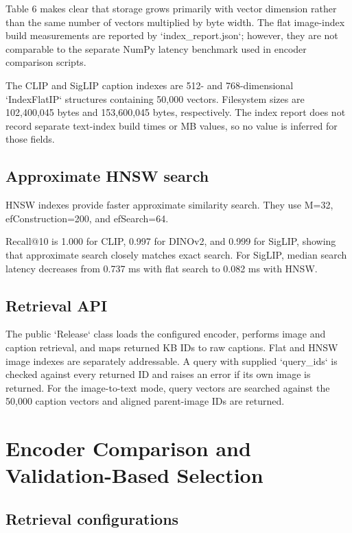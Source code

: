 \documentclass{article}
\begin{document}
Table 6 makes clear that storage grows primarily with vector dimension
rather than the same number of vectors multiplied by byte width. The
flat image-index build measurements are reported by
`index\_report.json`; however, they are not comparable to the separate
NumPy latency benchmark used in encoder comparison scripts.

The CLIP and SigLIP caption indexes are 512- and 768-dimensional
`IndexFlatIP` structures containing 50,000 vectors. Filesystem sizes are
102,400,045 bytes and 153,600,045 bytes, respectively. The index report
does not record separate text-index build times or MB values, so no
value is inferred for those fields.

\subsection{Approximate HNSW search}\label{approximate-hnsw-search}

HNSW indexes provide faster approximate similarity search.
They use M=32, efConstruction=200, and efSearch=64.

Recall@10 is 1.000 for CLIP, 0.997 for DINOv2, and 0.999 for
SigLIP, showing that approximate search closely matches exact
search. For SigLIP, median search latency decreases from 0.737 ms
with flat search to 0.082 ms with HNSW.

\subsection{Retrieval API}\label{retrieval-api}

The public `Release` class loads the configured encoder, performs image
and caption retrieval, and maps returned KB IDs to raw captions. Flat
and HNSW image indexes are separately addressable. A query with supplied
`query\_ids` is checked against every returned ID and raises an error if
its own image is returned. For the image-to-text mode, query vectors are
searched against the 50,000 caption vectors and aligned parent-image IDs
are returned.


\newpage

\section{Encoder Comparison and Validation-Based
Selection}\label{encoder-comparison-and-validation-based-selection}

\subsection{Retrieval
configurations}\label{retrieval-configurations}
\end{document}
